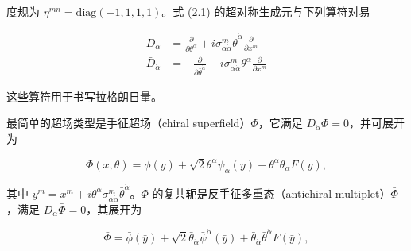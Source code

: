 
度规为 $\eta^{mn}=\mathrm{diag}(-1,1,1,1)$。式 (2.1) 的超对称生成元与下列算符对易


\begin{equation}
\begin{aligned}
D_\alpha &= \frac{\partial}{\partial\theta^\alpha} + i\sigma^m_{\alpha\dot\alpha}\bar\theta^{\dot\alpha}\frac{\partial}{\partial x^m}\\
\bar D_{\dot\alpha} &= -\frac{\partial}{\partial\bar\theta^{\dot\alpha}} - i\sigma^m_{\alpha\dot\alpha}\theta^\alpha\frac{\partial}{\partial x^m}
\end{aligned}
\tag{2.3}
\end{equation}

这些算符用于书写拉格朗日量。

最简单的超场类型是手征超场（chiral superfield）$\Phi$，它满足 $\bar D_{\dot\alpha}\Phi=0$，并可展开为

\begin{equation}
\Phi(x,\theta)=\phi(y)+\sqrt2\theta^\alpha\psi_\alpha(y)+\theta^\alpha\theta_\alpha F(y),
\tag{2.4}
\end{equation}

其中 $y^m=x^m+i\theta^\alpha\sigma^m_{\alpha\dot\alpha}\bar\theta^{\dot\alpha}$。$\Phi$ 的复共轭是反手征多重态（antichiral multiplet）$\bar\Phi$，满足 $D_\alpha\bar\Phi=0$，其展开为

\label{op:6}

\begin{equation}
\bar\Phi=\bar\phi(\bar y)+\sqrt2\bar\theta_{\dot\alpha}\bar\psi^{\dot\alpha}(\bar y)+\bar\theta_{\dot\alpha}\bar\theta^{\dot\alpha}F(\bar y),
\tag{2.5}
\end{equation}

